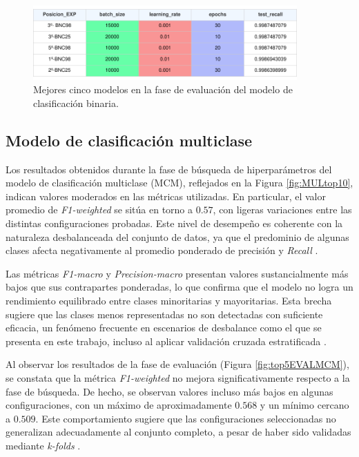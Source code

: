 \begin{figure}[H]
    \centering
    \includegraphics[width=0.9\textwidth]{./img/evaluacion/resultados/top5EVALMCB.pdf}
    \caption{Mejores cinco modelos en la fase de evaluación del modelo de clasificación binaria.}
    \label{fig:top5EVALMCB}
\end{figure}

\subsection{Modelo de clasificación multiclase}

Los resultados obtenidos durante la fase de búsqueda de hiperparámetros del modelo de clasificación multiclase (MCM), reflejados en la Figura \ref{fig:MULtop10}, indican valores moderados en las métricas utilizadas. En particular, el valor promedio de \textit{F1-weighted} se sitúa en torno a $0{.}57$, con ligeras variaciones entre las distintas configuraciones probadas. Este nivel de desempeño es coherente con la naturaleza desbalanceada del conjunto de datos, ya que el predominio de algunas clases afecta negativamente al promedio ponderado de precisión y \textit{Recall} \cite{he2009learning}.

Las métricas \textit{F1-macro} y \textit{Precision-macro} presentan valores sustancialmente más bajos que sus contrapartes ponderadas, lo que confirma que el modelo no logra un rendimiento equilibrado entre clases minoritarias y mayoritarias. Esta brecha sugiere que las clases menos representadas no son detectadas con suficiente eficacia, un fenómeno frecuente en escenarios de desbalance como el que se presenta en este trabajo, incluso al aplicar validación cruzada estratificada \cite{johnson2019survey}.

Al observar los resultados de la fase de evaluación (Figura \ref{fig:top5EVALMCM}), se constata que la métrica \textit{F1-weighted} no mejora significativamente respecto a la fase de búsqueda. De hecho, se observan valores incluso más bajos en algunas configuraciones, con un máximo de aproximadamente $0{.}568$ y un mínimo cercano a $0{.}509$. Este comportamiento sugiere que las configuraciones seleccionadas no generalizan adecuadamente al conjunto completo, a pesar de haber sido validadas mediante \textit{k-folds} \cite{reimers2017optimal}.

